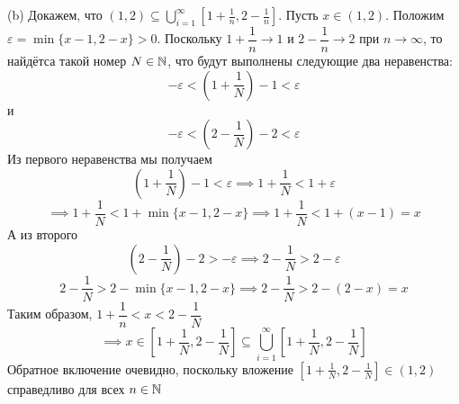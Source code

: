{    (b) Докажем, что $(1, 2) \subseteq \displaystyle \bigcup_{i=1}^\infty \left[1 + \frac{1}{n}, 2 - \frac{1}{n}\right]$. Пусть $x \in (1, 2)$. Положим
    $\varepsilon = \min \{x - 1, 2 - x\} > 0$. Поскольку $1 + \dfrac{1}{n} \to 1$ и $2 - \dfrac{1}{n} \to 2$ при $n \to \infty$, то найдётса такой номер $N \in \mathbb{N}$, что будут выполнены следующие два неравенства:
    \[-\varepsilon < \left(1 + \frac{1}{N}\right) - 1 < \varepsilon\]
    и
    \[-\varepsilon < \left(2 - \frac{1}{N}\right) - 2 < \varepsilon\]
    Из первого неравенства мы получаем
    \[\left(1 + \frac{1}{N}\right) - 1 < \varepsilon \implies 1 + \frac{1}{N} < 1 + \varepsilon\]
    \[\implies 1 + \frac{1}{N} < 1 + \min\{x - 1, 2 - x\} \implies 1 + \frac{1}{N} < 1 + (x - 1) = x\]
    А из второго
    \[\left(2 - \frac{1}{N}\right) - 2 > -\varepsilon \implies 2 - \frac{1}{N} > 2 - \varepsilon\]
    \[2 - \frac{1}{N} > 2 - \min\{x - 1, 2 - x\} \implies 2 - \frac{1}{N} > 2 - (2 - x) = x\]
    Таким образом, $1 + \dfrac{1}{n} < x < 2 - \dfrac{1}{N}$
    \[\implies x \in \left[1 + \frac{1}{N}, 2 - \frac{1}{N}\right] \subseteq \bigcup_{i=1}^\infty \left[1 + \frac{1}{N}, 2 - \frac{1}{N}\right]\]
    Обратное включение очевидно, поскольку вложение $\displaystyle \left[1 + \frac{1}{N}, 2 - \frac{1}{N}\right] \in (1, 2)$ справедливо для всех $n \in \mathbb{N}$
}
